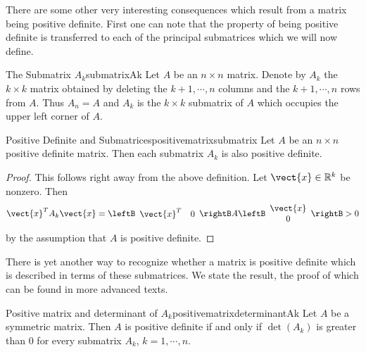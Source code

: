 There are some other very interesting consequences which result from a
matrix being positive definite. First one can note that the property of
being positive definite is transferred to each of the principal submatrices which we will now define.

\begin{definition}{The Submatrix $A_k$}{submatrixAk}
Let $A$ be an $n\times n$ matrix. Denote by $A_{k}$ the $k\times k$ matrix
obtained by deleting the $k+1,\cdots ,n$ columns and the $k+1,\cdots ,n$
rows from $A.$ Thus $A_{n}=A$ and $A_{k}$ is the $k\times k$ submatrix of $A$
which occupies the upper left corner of $A.$
\end{definition}

\begin{lemma}{Positive Definite and Submatrices}{positivematrixsubmatrix}
Let $A$ be an $n\times n$ positive definite matrix.  Then each submatrix $A_{k}$ is also positive definite.
\end{lemma}

\begin{proof}
This follows right away from the above definition. Let $\vect{x}\in \mathbb{R}^{k}$ be nonzero. Then 
\begin{equation*}
\vect{x}^{T}A_{k}\vect{x}=\leftB 
\begin{array}{cc}
\vect{x}^{T} & 0
\end{array}
\rightB A\leftB 
\begin{array}{c}
\vect{x} \\ 
0
\end{array}
\rightB >  0
\end{equation*}
by the assumption that $A$ is positive definite.
\end{proof}

There is yet another way to recognize whether a matrix is positive definite
which is described in terms of these submatrices. We state the result,  the proof
of which can be found in more advanced texts.

\begin{theorem}{Positive matrix and determinant of $A_k$}{positivematrixdeterminantAk}   
Let $A$ be a symmetric matrix. Then $A$ is positive definite if
and only if $\det \left( A_{k}\right)$ is greater than $0$ for every submatrix $A_{k}$,  $k=1,\cdots ,n$. 
\end{theorem}


